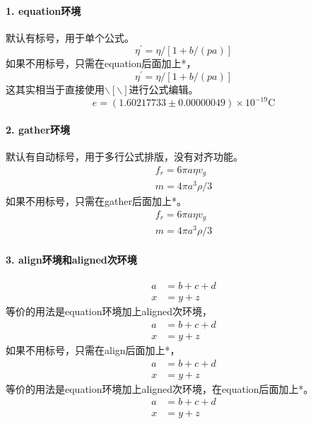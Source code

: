 \documentclass[12pt,a4paper,UTF8]{ctexart}
\begin{document}
	\paragraph*{1. equation环境}默认有标号，用于单个公式。
		\begin{equation}
		\eta^{\prime}=\eta /[1+b /(p a)]
		\end{equation}
		如果不用标号，只需在equation后面加上*，
		\begin{equation}
			\eta^{\prime}=\eta /[1+b /(p a)]
		\end{equation}
		这其实相当于直接使用$\backslash[\backslash]$进行公式编辑。
		\[e=(1.60217733 \pm 0.00000049) \times 10^{-19} \mathrm{C}\]

	\paragraph*{2. gather环境}默认有自动标号，用于多行公式排版，没有对齐功能。
		\begin{gather}
		f_r=6\pi a \eta v_g   \\
		m=4 \pi a^{3} \rho / 3
		\end{gather}
		如果不用标号，只需在gather后面加上*。
		\begin{gather*}
			f_r=6\pi a \eta v_g   \\
			m=4 \pi a^{3} \rho / 3
		\end{gather*}

	\paragraph*{3. align环境和aligned次环境}
		\begin{align}
		a &= b+c+d \\
		x &= y+z
		\end{align}
		等价的用法是equation环境加上aligned次环境，
		\begin{equation}
			\begin{aligned}
			a &= b+c+d \\
			x &= y+z
			\end{aligned}
		\end{equation}
		如果不用标号，只需在align后面加上*，
		\begin{align*}
			a &= b+c+d \\
			x &= y+z
		\end{align*}
		等价的用法是equation环境加上aligned次环境，在equation后面加上*。
		\begin{equation}
			\begin{aligned}
			a &= b+c+d \\
			x &= y+z
			\end{aligned}
		\end{equation}
\end{document}
